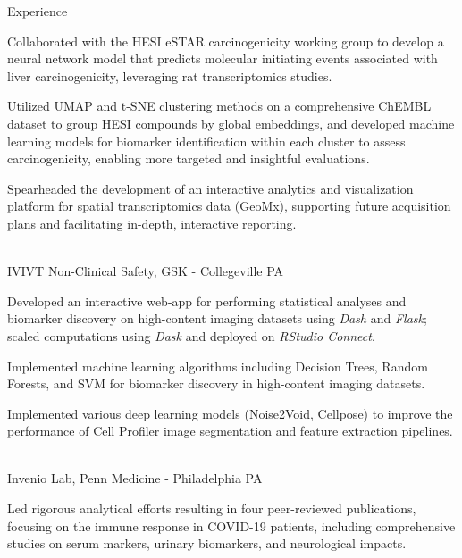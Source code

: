 \documentclass[]{resume-knyte}
\begin{document}
\begin{topic}{Experience}
{        \item Collaborated with the HESI eSTAR carcinogenicity working group to develop a neural network model that predicts molecular initiating events associated with liver carcinogenicity, leveraging rat transcriptomics studies.
        \vspace{-5pt}

        \item Utilized UMAP and t-SNE clustering methods on a comprehensive ChEMBL dataset to group HESI compounds by global embeddings, and developed machine learning models for biomarker identification within each cluster to assess carcinogenicity, enabling more targeted and insightful evaluations.
        \vspace{-5pt}

        \item Spearheaded the development of an interactive analytics and visualization platform for spatial transcriptomics data (GeoMx), supporting future acquisition plans and facilitating in-depth, interactive reporting.
    }\\

    {IVIVT Non-Clinical Safety, GSK - Collegeville PA}
    {
        \item Developed an interactive web-app for performing statistical analyses and biomarker discovery on high-content imaging datasets using \textit{Dash} and \textit{Flask}; scaled computations using \textit{Dask} and deployed on \textit{RStudio Connect}.
        \vspace{-5pt}

        \item Implemented machine learning algorithms including Decision Trees, Random Forests, and SVM for biomarker discovery in high-content imaging datasets.
        \vspace{-5pt}

        \item Implemented various deep learning models (Noise2Void, Cellpose) to improve the performance of Cell Profiler image segmentation and feature extraction pipelines.
        \vspace{-5pt}
    }\\

    {Invenio Lab, Penn Medicine - Philadelphia PA}
    {
        \item Led rigorous analytical efforts resulting in four peer-reviewed publications, focusing on the immune response in COVID-19 patients, including comprehensive studies on serum markers, urinary biomarkers, and neurological impacts.
        \vspace{-5pt}

}
\end{topic}
\end{document}
